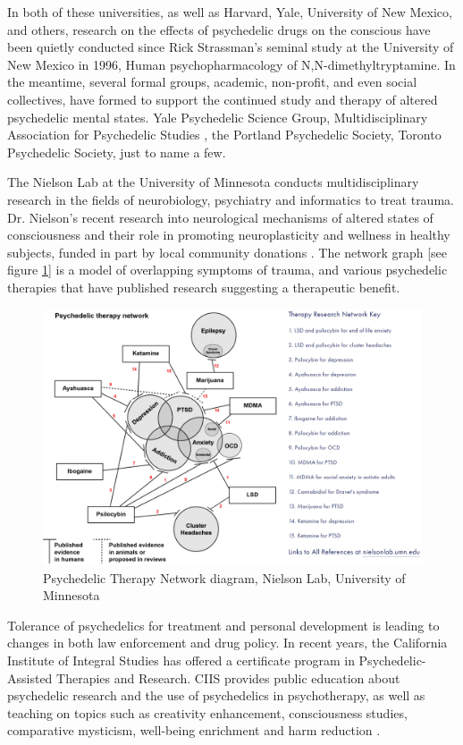 \documentclass{UIdahoMastersThesis}
\begin{document}
In both of these universities, as well as Harvard, Yale, University of New Mexico, and others, research on the effects of psychedelic drugs on the conscious have been quietly conducted since Rick Strassman's seminal study at the University of New Mexico in 1996, Human psychopharmacology of N,N-dimethyltryptamine. In the meantime, several formal groups, academic, non-profit, and even social collectives, have formed to support the continued study and therapy of altered psychedelic mental states.  Yale Psychedelic Science Group, Multidisciplinary Association for Psychedelic Studies  , the Portland Psychedelic Society, Toronto Psychedelic Society, just to name a few.

The Nielson Lab at the University of Minnesota conducts multidisciplinary research in the fields of neurobiology, psychiatry and informatics to treat trauma. Dr. Nielson's recent research into neurological mechanisms of altered states of consciousness and their role in promoting neuroplasticity and wellness in healthy subjects, funded in part by local community donations \cite{noauthor_nielson_nodate}. The network graph [see figure \ref{fig:therapy}] is a model of overlapping symptoms of trauma, and various psychedelic therapies that have published research suggesting a therapeutic benefit.

\begin{figure}
	\centering
	\includegraphics[width=\linewidth]{therapy.png}	
	\caption{Psychedelic Therapy Network diagram, Nielson Lab, University of Minnesota}
	\label{fig:therapy}
\end{figure}

Tolerance of psychedelics for treatment and personal development is leading to changes in both law enforcement and drug policy. In recent years, the California Institute of Integral Studies has offered a certificate program in Psychedelic-Assisted Therapies and Research. CIIS provides public education about psychedelic research and the use of psychedelics in psychotherapy, as well as teaching on topics such as creativity enhancement, consciousness studies, comparative mysticism, well-being enrichment and harm reduction \cite{noauthor_ciis_nodate}.
\end{document}
